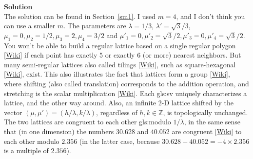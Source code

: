 \documentclass[10pt]{article}
\begin{document}
\begin{Exercise}
{\bf Solution} \vspace{1ex}\\
The solution can be found in Section~\ref{sm1}. I used $m=4$, and I don't think you can use a smaller $m$. The parameters are 
$\lambda=1/3$, $\lambda'=\sqrt{3}/3$, $\mu_1=0, \mu_2=1/2, \mu_3=2, \mu_4=3/2 $ and $\mu'_1=0, \mu'_2=\sqrt{3}/2, \mu'_3=0, \mu'_4=\sqrt{3}/2$. You won't be able to build a regular lattice based on a 
single regular polygon [\href{https://en.wikipedia.org/wiki/Regular_polygon}{Wiki}] if each point has exactly 5 or exactly 6 (or more) nearest neighbors. But many \textcolor{index}{semi-regular lattices} also called 
\textcolor{index}{tilings}
[\href{https://en.wikipedia.org/wiki/Euclidean_tilings_by_convex_regular_polygons}{Wiki}], 
such as square-hexagonal [\href{https://en.wikipedia.org/wiki/Truncated_square_tiling}{Wiki}], exist.  
This also illustrates the fact that lattices form 
a \textcolor{index}{group} [\href{https://en.wikipedia.org/wiki/Lattice_(group)}{Wiki}], where shifting (also called translation) corresponds to the addition operation, and stretching
is the scalar multiplication [\href{https://en.wikipedia.org/wiki/Scalar_multiplication}{Wiki}].  Each \gls{gls:sv} uniquely characterizes a lattice, and the other way around. Also, an infinite 2-D lattice shifted by the vector
$(\mu,\mu')=(h/\lambda,k/\lambda)$, regardless of $h,k\in\mathbb{Z}$, is topologically unchanged. The two lattices are 
\textcolor{index}{congruent} to each other \gls{gls:modulo} $1/\lambda$, in the same sense that (in one dimension) the numbers $30.628$ and $40.052$ are congruent 
 [\href{https://en.wikipedia.org/wiki/Modular_arithmetic}{Wiki}] to each other modulo $2.356$ (in the latter case, because
$30.628 - 40.052 = -4\times 2.356$ is a multiple of $2.356$).
\end{Exercise}
\end{document}
